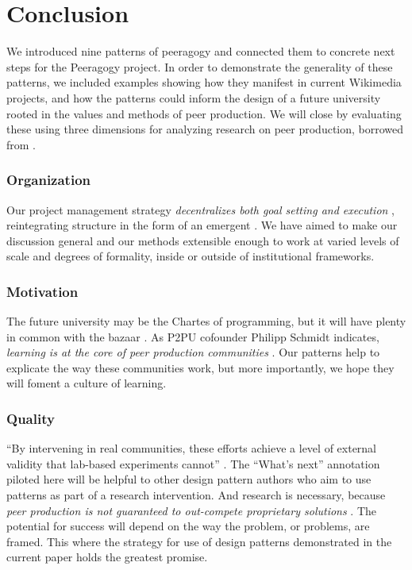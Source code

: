 \section{Conclusion}\label{sec:Conclusion}

We introduced nine patterns of peeragogy and connected them to
concrete next steps for the Peeragogy project.  In order to
demonstrate the generality of these patterns, we included examples
showing how they manifest in current Wikimedia projects, and 
how the patterns could inform the design of a future university rooted in the
values and methods of peer production.
%
We will close by evaluating these using
three dimensions for analyzing research on peer production, borrowed
from \cite{benkler2015peer}.

\vspace{-.25\baselineskip}

\subsubsection*{Organization} 
Our project management strategy \emph{decentralizes both goal setting
  and execution} \cite{benkler2015peer}, reintegrating structure in
the form of an emergent .  We have aimed to make
our discussion general and our methods extensible enough to work at
varied levels of scale and degrees of formality, inside or outside of
institutional frameworks.

\vspace{-.25\baselineskip}

\subsubsection*{Motivation}  The future university may be
the Chartes of programming, but it will have plenty in common with the
bazaar \cite{raymond2001cathedral}.  As P2PU cofounder Philipp Schmidt
indicates, \emph{learning is at the core of peer production
  communities} \cite{schmidt+commons-based+2009}.  Our patterns help
to explicate the way these communities work, but more importantly,
we hope they will foment a culture of learning.

\vspace{-.25\baselineskip}

\subsubsection*{Quality} 
``By intervening in real communities, these efforts achieve a level of
external validity that lab-based experiments cannot''
\cite{benkler2015peer}.  The ``What's next'' annotation piloted here
will be helpful to other design pattern authors who aim to use
patterns as part of a research intervention.  And research is
necessary, because \emph{peer production is not guaranteed to
  out-compete proprietary solutions}
\cite{benkler2015peer,free-software-better}.  The potential for
success will depend on the way the problem, or problems, are framed.
This where the strategy for use of design patterns demonstrated in the
current paper holds the greatest promise.

